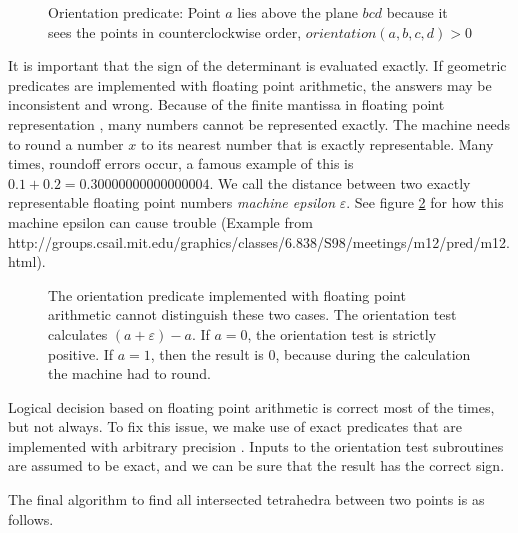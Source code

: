 \documentclass[../thesis.tex]{subfiles}
\begin{document}
\begin{figure}[htb]
  \centering
  \def\svgwidth{20em}
  
  \caption{Orientation predicate: Point $a$ lies above the plane $bcd$ because it sees the points in counterclockwise order, $orientation(a,b,c,d)>0$}
  \label{fig:orient2d}
\end{figure}
It is important that the sign of the determinant is evaluated exactly.
If geometric predicates are implemented with floating point arithmetic,
the answers may be inconsistent and wrong.
Because of the finite mantissa in floating point representation \cite{ieee754}, many numbers cannot be represented exactly.
The machine needs to round a number $x$ to its nearest number that is exactly representable.
Many times, roundoff errors occur, a famous example of this is $0.1 + 0.2 = 0.30000000000000004$.
We call the distance between two exactly representable floating point numbers \emph{machine epsilon} $\varepsilon$.
See figure \ref{fig:floatingpoint} for how this machine epsilon can cause trouble (Example from http://groups.csail.mit.edu/graphics/classes/6.838/S98/meetings/m12/pred/m12.html).
\begin{figure}[htb]
  \centering
  \def\svgwidth{20em}
  
  \caption{The orientation predicate implemented with floating point arithmetic cannot distinguish these two cases.
  The orientation test calculates $(a+\varepsilon)-a$. If $a=0$, the orientation test is strictly positive.
  If $a=1$, then the result is $0$, because during the calculation the machine had to round.
  }\label{fig:floatingpoint}
\end{figure}
Logical decision based on floating point arithmetic is correct most of the times, but not always.
To fix this issue, we make use of exact predicates that are implemented with arbitrary precision \cite{RichardShewchuk1997}.
Inputs to the orientation test subroutines are assumed to be exact, and we can be sure
that the result has the correct sign.

The final algorithm to find all intersected tetrahedra between two points is as follows.
\end{document}

